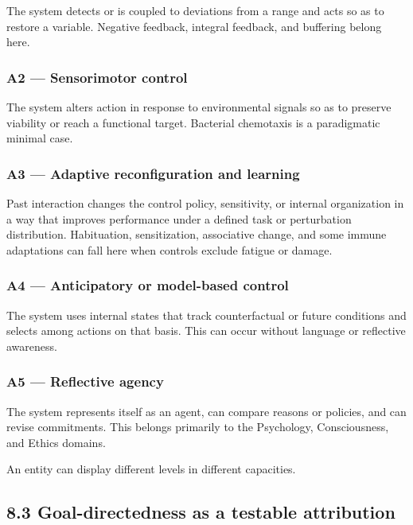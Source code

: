 \documentclass[
  11pt,
]{article}
\begin{document}
The system detects or is coupled to deviations from a range and acts so
as to restore a variable. Negative feedback, integral feedback, and
buffering belong here.

\subsubsection{A2 --- Sensorimotor
control}\label{a2-sensorimotor-control}

The system alters action in response to environmental signals so as to
preserve viability or reach a functional target. Bacterial chemotaxis is
a paradigmatic minimal case.

\subsubsection{A3 --- Adaptive reconfiguration and
learning}\label{a3-adaptive-reconfiguration-and-learning}

Past interaction changes the control policy, sensitivity, or internal
organization in a way that improves performance under a defined task or
perturbation distribution. Habituation, sensitization, associative
change, and some immune adaptations can fall here when controls exclude
fatigue or damage.

\subsubsection{A4 --- Anticipatory or model-based
control}\label{a4-anticipatory-or-model-based-control}

The system uses internal states that track counterfactual or future
conditions and selects among actions on that basis. This can occur
without language or reflective awareness.

\subsubsection{A5 --- Reflective agency}\label{a5-reflective-agency}

The system represents itself as an agent, can compare reasons or
policies, and can revise commitments. This belongs primarily to the
Psychology, Consciousness, and Ethics domains.

An entity can display different levels in different capacities.

\subsection{8.3 Goal-directedness as a testable
attribution}\label{goal-directedness-as-a-testable-attribution}
\end{document}
